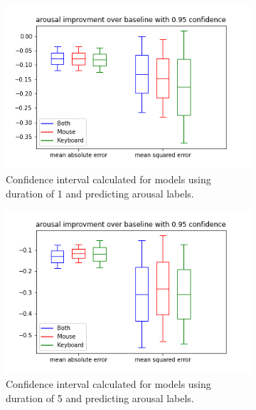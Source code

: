 \documentclass[../main.tex]{subfiles}
\begin{document}
\begin{figure}[!h]
    \begin{subfigure}[b]{0.31\textwidth}
        \centering
        \includegraphics[width=\textwidth]{figures/results/interval_difference/1/1_arousal_0.95.png}
        \captionsetup{justification=centering}
        \caption{Confidence interval calculated for models using duration of 1 and predicting arousal labels.}
    \end{subfigure}
    \hfill
    \begin{subfigure}[b]{0.31\textwidth}
        \centering
        \includegraphics[width=\textwidth]{figures/results/interval_difference/5/5_arousal_0.95.png}
        \captionsetup{justification=centering}
        \caption{Confidence interval calculated for models using duration of 5 and predicting arousal labels.}
    \end{subfigure}
    \begin{subfigure}[b]{0.31\textwidth}

\end{subfigure}
\end{figure}
\end{document}
